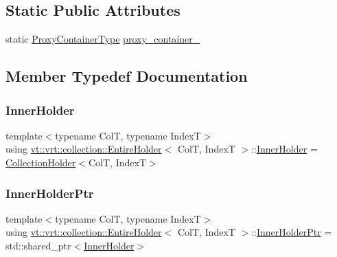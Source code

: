 \subsection*{Static Public Attributes}
\begin{DoxyCompactItemize}
\item 
static \hyperlink{structvt_1_1vrt_1_1collection_1_1_entire_holder_a40524236d95912099482d033b337db81}{Proxy\+Container\+Type} \hyperlink{structvt_1_1vrt_1_1collection_1_1_entire_holder_aa2fccfb10abea9c3cdd0987f6eff5ccb}{proxy\+\_\+container\+\_\+}
\end{DoxyCompactItemize}


\subsection{Member Typedef Documentation}
\mbox{\label{structvt_1_1vrt_1_1collection_1_1_entire_holder_a79a0b61eec1c65f662f3dfbf9adae52e}} 
\subsubsection{\texorpdfstring{Inner\+Holder}{InnerHolder}}
{\footnotesize\ttfamily template$<$typename ColT, typename IndexT$>$ \\
using \hyperlink{structvt_1_1vrt_1_1collection_1_1_entire_holder}{vt\+::vrt\+::collection\+::\+Entire\+Holder}$<$ ColT, IndexT $>$\+::\hyperlink{structvt_1_1vrt_1_1collection_1_1_entire_holder_a79a0b61eec1c65f662f3dfbf9adae52e}{Inner\+Holder} =  \hyperlink{structvt_1_1vrt_1_1collection_1_1_collection_holder}{Collection\+Holder}$<$ColT, IndexT$>$}

\mbox{\label{structvt_1_1vrt_1_1collection_1_1_entire_holder_a33e5814cfc24ea357365fa5e2296b08f}} 
\subsubsection{\texorpdfstring{Inner\+Holder\+Ptr}{InnerHolderPtr}}
{\footnotesize\ttfamily template$<$typename ColT, typename IndexT$>$ \\
using \hyperlink{structvt_1_1vrt_1_1collection_1_1_entire_holder}{vt\+::vrt\+::collection\+::\+Entire\+Holder}$<$ ColT, IndexT $>$\+::\hyperlink{structvt_1_1vrt_1_1collection_1_1_entire_holder_a33e5814cfc24ea357365fa5e2296b08f}{Inner\+Holder\+Ptr} =  std\+::shared\+\_\+ptr$<$\hyperlink{structvt_1_1vrt_1_1collection_1_1_entire_holder_a79a0b61eec1c65f662f3dfbf9adae52e}{Inner\+Holder}$>$}

